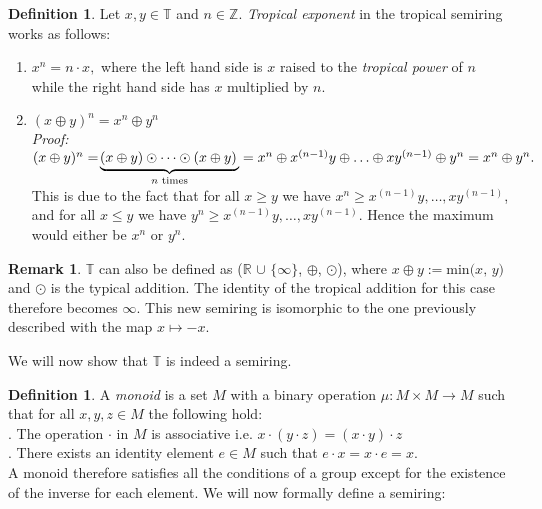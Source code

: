 \documentclass[]{article}
\theoremstyle{definition}
\numberwithin{equation}{section}
\newtheorem{defn}[thm]{Definition}
\newtheorem{rmk}[thm]{Remark}
\newcommand{\R}{\mathbb{R}}
\renewcommand{\.}{\,.}
\begin{document}
\begin{defn} Let $x,y \in \mathbb{T}$ and $n \in \mathbb{Z}$. \emph{Tropical exponent}  in the tropical semiring works as follows:
	\begin{enumerate}[noitemsep,topsep=-6pt]
		\item \vspace{0.75mm}
	 	$x^n=n \cdot x,$ where the left hand side is $x$ raised to the \emph{tropical power} of $n$ while the right hand side has $x$ multiplied by $n$.
	   \vspace{2mm}
	 	\item $(x \oplus y)^n = x^n \oplus y^n  $\\	\emph{Proof:} $(x \oplus y)^n =
	 	\smash[b]{\! \underbrace{(x \oplus y) \odot \cdots \odot (x \oplus y)\,}_\text{$n$ times}}=x^n \oplus x^{(n-1)}y  \oplus  \ldots \oplus xy^{(n-1)} \oplus y^n = x^n \oplus y^n.  $ \\ \vspace{-1mm} \\ This is due to the fact that for all $x\geq y$ we have $x^n \geq x^{(n-1)}y,  \ldots ,xy^{(n-1)}$, and for all $x\leq y$ we have $y^n \geq x^{(n-1)}y,  \ldots ,xy^{(n-1)}$. Hence  the maximum would either be $x^n$ or $y^n$.\vspace{3mm}
	 	\end{enumerate}
\end{defn}
\begin{rmk} $\mathbb{T}$ can also be defined as ($\R$  $\cup$ $\{\infty\}$, $\oplus$, $\odot$), where $x \oplus y := \textrm{min($x$, $y$)}$ and $\odot$ is the typical addition. The identity of the tropical addition for this case therefore becomes $ \infty $. This new semiring is isomorphic to the one previously described with the map $x\mapsto-x$. 
\end{rmk}
\hspace*{3mm} We will now show that $\mathbb{T}$ is indeed a semiring.



\begin{defn} A \emph{monoid} is a set $M$ with a binary operation $\mu : M \times M \rightarrow M$  such that for all $x, y, z \in M$ the following hold: 
		\\ \setlength{\parindent}{5ex} . The operation $\cdot$ in $M$ is associative i.e. $x \cdot (y \cdot z)  = (x \cdot y) \cdot z$ \\
		. There exists an identity element $e \in M$ such that $e \cdot x= x \cdot e = x$. \\
\hspace*{3mm} A monoid therefore satisfies all the conditions of a group except for the existence of the inverse for each element. We will now formally define a semiring: 
\end{defn}
\end{document}
